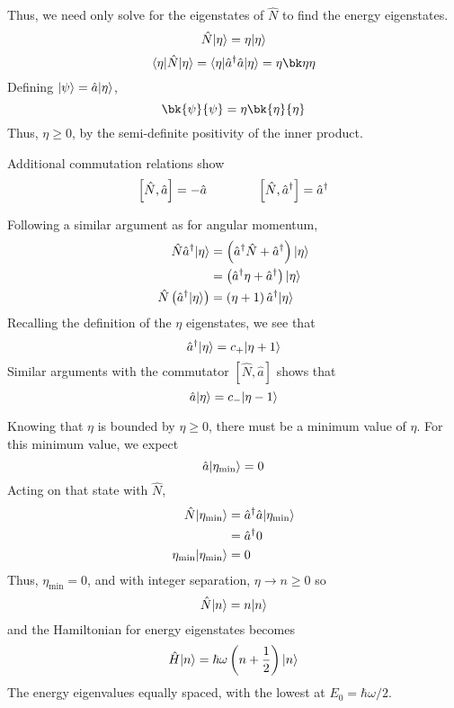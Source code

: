 Thus, we need only solve for the eigenstates of \(\hat N\) to find the energy eigenstates. 
\[\hat N \lvert\eta\rangle = \eta\lvert\eta\rangle\]
\[\b\eta\hat N \k\eta =\b\eta\hat a\adj \hat a \k\eta= \eta\bk\eta\eta\]
Defining \(\lvert\psi\rangle = \hat a \lvert\eta\rangle\),
\[\bk{\p}{\p} = \eta\bk{\eta}{\eta}\]
Thus, \(\eta\geq0\), by the semi-definite positivity of the inner product.

Additional commutation relations show
\begin{equation}
	\left[\hat N, \hat a \right] = -\hat a \qquad\qquad \left[\hat N, \hat a^{\dagger}\right] = \hat a ^{\dagger}
\end{equation}

Following a similar argument as for angular momentum,
\begin{align*}
	\hat N \hat a^{\dagger} \lvert\eta\rangle &= \left(\hat a ^{\dagger} \hat N + \hat a^{\dagger}\right)\lvert\eta\rangle\\
				 &= \left(\hat a ^{\dagger} \eta + \hat a ^{\dagger}\right)\lvert\eta\rangle\\
\hat N \left(\hat a ^{\dagger}\lvert\eta\rangle\right) &=\left(\eta + 1\right)\hat a^{\dagger}\lvert\eta\rangle
\end{align*}
Recalling the definition of the \(\eta\) eigenstates, we see that
\[\hat a ^{\dagger}\lvert\eta\rangle =c_+\lvert\eta+1\rangle\]
Similar arguments with the commutator \(\left[\hat N, \hat a\right]\) shows that
\[\hat a \lvert\eta\rangle = c_-\lvert\eta-1\rangle\]

Knowing that \(\eta\) is bounded by \(\eta\geq0\), there must be a minimum value of \(\eta\). For this minimum value, we expect
\[\hat a \lvert\eta_{\min}\rangle=0\]
Acting on that state with \(\hat N\),
\begin{align*}
	\hat N \lvert\eta_{\min}\rangle&=\hat a ^{\dagger} \hat a \lvert\eta_{\min}\rangle\\
			    &=\hat a^{\dagger} 0\\
	\eta_{\min}\lvert\eta_{\min}\rangle&=0
\end{align*}
Thus, \(\eta_{\min}=0\), and with integer separation, \(\eta\to n\geq0\) so
\[\hat N\lvert n\rangle = n\lvert n\rangle\]
and the Hamiltonian for energy eigenstates becomes
\begin{equation}
	\hat H \lvert n\rangle =\hbar\omega \left(n+\frac{1}{2}\right)\lvert n\rangle
\end{equation}
The energy eigenvalues equally spaced, with the lowest at \(E_0 = \hbar\omega/2\).

